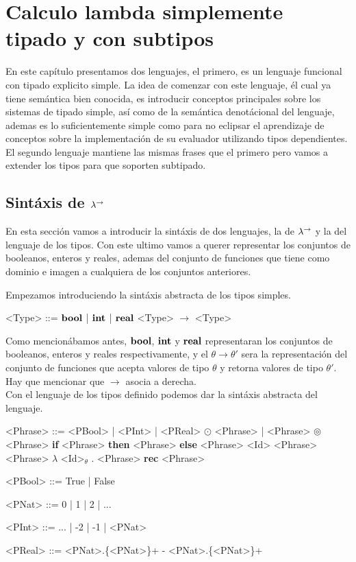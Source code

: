 \chapter{Calculo lambda simplemente tipado y con subtipos}
\label{chap:lambdaarrow}

En este cap\'itulo presentamos dos lenguajes, el primero, es un
lenguaje funcional con tipado explicito simple. La idea de comenzar con 
este lenguaje, \'el cual ya tiene sem\'antica bien conocida, es introducir
conceptos principales sobre los sistemas de tipado simple, as\'i
como de la sem\'antica denot\'acional del lenguaje, ademas es lo 
suficientemente simple como para no eclipsar el aprendizaje de 
conceptos sobre la implementaci\'on de su evaluador utilizando 
tipos dependientes.
El segundo lenguaje mantiene las mismas frases que el primero
pero vamos a extender los tipos para que soporten subtipado.

\section{Sint\'axis de $\lambda^{\rightarrow}$}

En esta secci\'on vamos a introducir la sint\'axis de dos lenguajes, 
la de $\lambda^{\rightarrow}$ y la del lenguaje de los tipos.
Con este ultimo vamos a querer representar los conjuntos de booleanos, enteros
y reales, ademas del conjunto de funciones que tiene como dominio
e imagen a cualquiera de los conjuntos anteriores.

Empezamos introduciendo la sint\'axis abstracta de los tipos simples.

\setlength{\grammarindent}{6em}
\begin{grammar}

<Type> ::= $\textbf{bool}$ | $\textbf{int}$ | $\textbf{real}$
\alt <Type> $\rightarrow$ <Type>

\end{grammar}

Como mencion\'abamos antes, $\textbf{bool}$, $\textbf{int}$ y $\textbf{real}$ representaran 
los conjuntos de booleanos, enteros y reales respectivamente, y el
$\theta \rightarrow \theta'$ sera la representaci\'on del conjunto
de funciones que acepta valores de tipo $\theta$ y retorna valores
de tipo $\theta'$. Hay que mencionar que $\rightarrow$ asocia a derecha.\\

Con el lenguaje de los tipos definido podemos dar la sint\'axis
abstracta del lenguaje.

\setlength{\grammarindent}{6em}
\begin{grammar}

<Phrase> ::= <PBool> | <PInt> | <PReal>
\alt $\odot$ <Phrase> | <Phrase> $\circledcirc$ <Phrase>
\alt \textbf{if} <Phrase> \textbf{then} <Phrase> \textbf{else} <Phrase>
\alt <Id> 
\alt <Phrase> <Phrase>
\alt $\lambda$ <Id>$_\theta$ . <Phrase>
\alt \textbf{rec} <Phrase>

<PBool> ::= True | False

<PNat>  ::= 0 | 1 | 2 | ...

<PInt>  ::= ... | -2 | -1 | <PNat> 

<PReal> ::= <PNat>.\{<PNat>\}+ 
\alt - <PNat>.\{<PNat>\}+

\end{grammar}

